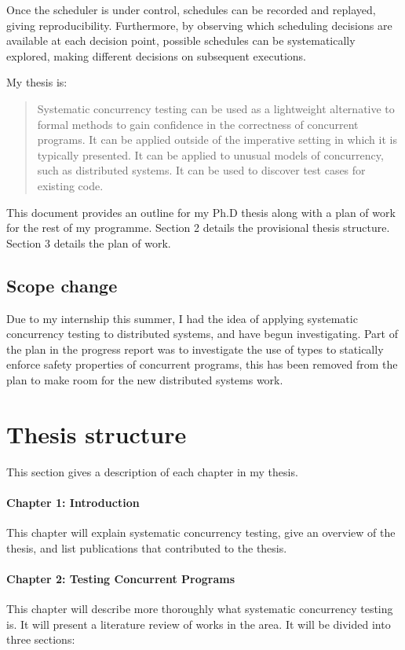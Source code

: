\documentclass{article}
\begin{document}
Once the scheduler is under control, schedules can be recorded and
replayed, giving reproducibility. Furthermore, by observing which
scheduling decisions are available at each decision point, possible
schedules can be systematically explored, making different decisions
on subsequent executions.

My thesis is:

\begin{quote}
  Systematic concurrency testing can be used as a lightweight
  alternative to formal methods to gain confidence in the correctness
  of concurrent programs. It can be applied outside of the imperative
  setting in which it is typically presented. It can be applied to
  unusual models of concurrency, such as distributed systems. It can
  be used to discover test cases for existing code.
\end{quote}

This document provides an outline for my Ph.D thesis along with a plan
of work for the rest of my programme. Section 2 details the
provisional thesis structure. Section 3 details the plan of work.

\subsection{Scope change}

Due to my internship this summer, I had the idea of applying
systematic concurrency testing to distributed systems, and have begun
investigating. Part of the plan in the progress report was to
investigate the use of types to statically enforce safety properties
of concurrent programs, this has been removed from the plan to make
room for the new distributed systems work.

\section{Thesis structure}

This section gives a description of each chapter in my thesis.

\paragraph{Chapter 1: Introduction} This chapter will explain
systematic concurrency testing, give an overview of the thesis, and
list publications that contributed to the thesis.

\paragraph{Chapter 2: Testing Concurrent Programs} This chapter will
describe more thoroughly what systematic concurrency testing is. It
will present a literature review of works in the area. It will be
divided into three sections:
\end{document}
